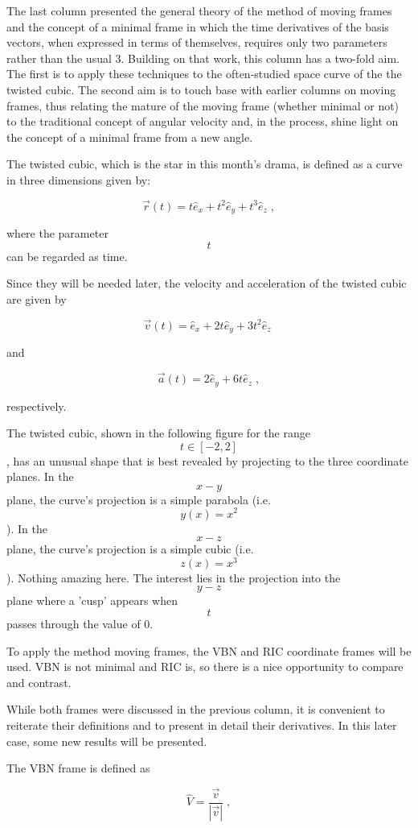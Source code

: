 \documentclass[10pt]{article}
\begin{document}
The last column presented the general theory of the method of moving frames and the concept of a minimal frame in which the time derivatives of the basis vectors, when expressed in terms of themselves, requires only two parameters rather than the usual 3.  Building on that work, this column has a two-fold aim.  The first is to apply these techniques to the often-studied space curve of the the twisted cubic.  The second aim is to touch base with earlier columns on moving frames, thus relating the mature of the moving frame (whether minimal or not) to the traditional concept of angular velocity and, in the process, shine light on the concept of a minimal frame from a new angle.

The twisted cubic, which is the star in this month's drama, is defined as a curve in three dimensions given by:

\[ \vec r(t) = t \hat e_x + t^2 \hat e_y + t^3 \hat e_z \; , \]

where the parameter $$t$$ can be regarded as time.

Since they will be needed later, the velocity and acceleration of the twisted cubic are given by

\[ \vec v(t) = \hat e_x + 2 t \hat e_y + 3 t^2 \hat e_z \; \]

and

\[ \vec a(t) =  2 \hat e_y + 6 t \hat e_z \; , \]

respectively.

The twisted cubic, shown in the following figure for the range $$t \in [-2,2]$$, has an unusual shape that is best revealed by projecting to the three coordinate planes.  In the $$x-y$$ plane, the curve's projection is a simple parabola (i.e. $$y(x) = x^2$$).  In the $$x-z$$ plane, the curve's projection is a simple cubic (i.e. $$z(x) = x^3$$).  Nothing amazing here.  The interest lies in the projection into the $$y-z$$ plane where a 'cusp' appears when $$t$$ passes through the value of 0.

To apply the method moving frames, the VBN and RIC coordinate frames will be used.  VBN is not minimal and RIC is, so there is a nice opportunity to compare and contrast.

While both frames were discussed in the previous column, it is convenient to reiterate their definitions and to present in detail their derivatives.  In this later case, some new results will be presented.

The VBN frame is defined as

\[ \hat V = \frac{\vec v}{|\vec v|} \; ,\]
\end{document}
